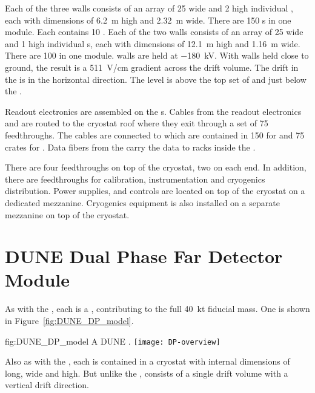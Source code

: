 Each of the three  walls consists of an array of \num{25}
wide and \num{2} high individual , each with dimensions
of \SI{6.2}{\meter} high and \SI{2.32}{\meter} wide. There are
\num{150} s in one module. Each  contains
\num{10} . Each of the two  walls consists of an
array of \num{25} wide and \num{1} high individual s, each
with dimensions of \SI{12.1}{\meter} high and \SI{1.16}{\meter}
wide. There are \num{100}  in one module.  
walls are held at $-$\SI{180}{\kilo\volt}. With  walls held
close to ground, the result is a \SI{511}{\volt/\centi\meter} gradient
across the drift volume. The drift in the  is in the horizontal 
direction. The  level is above the top set of  and just
below the .

Readout electronics are assembled on the s. Cables from the
readout electronics and  are routed to the cryostat roof
where they exit through a set of \num{75} feedthroughs. The cables are
connected to  which are contained in \num{150}
 for  and \num{75} crates for . Data
fibers from the  carry the data to  racks
inside the .

There are four  feedthroughs on top of the cryostat, two on
each end. In addition, there are feedthroughs for calibration,
instrumentation and cryogenics distribution. Power supplies, and
controls are located on top of the cryostat on a dedicated
mezzanine. Cryogenics equipment is also installed on a separate
mezzanine on top of the cryostat.

\section{DUNE Dual Phase Far Detector Module}
\label{sec:fdsp-DP-module}

As with the , each  is a \nominalmodsize {},
contributing to the full \SI{40}{\kilo\tonne}  fiducial
mass.  One \nominalmodsize {} is shown in
Figure~\ref{fig:DUNE_DP_model}.
\begin{dunefigure}{fig:DUNE_DP_model} {A \nominalmodsize DUNE   .}
  \texttt{[image: DP-overview]}
\end{dunefigure} 

Also as with the , each  is contained in a
cryostat with internal dimensions of \cryostatlen %
long,
\cryostatwdth %
wide and \cryostatht %
high. But unlike the
,  consists of a single drift volume with
a vertical drift direction.

